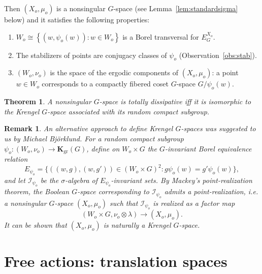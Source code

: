 \documentclass{amsart}
\numberwithin{equation}{subsection}
\newtheorem{rem}[thm]{Remark}
\newtheorem{mainthm}{Theorem}
\renewcommand{\themainthm}{\Alph{mainthm}}
\begin{document}
Then \(\left(X_{o},\mu_{o}\right)\) is a nonsingular \(G\)-space (see Lemma~\ref{lem:standardsigma} below) and it satisfies the following properties:
\begin{enumerate}
    \item \(W_{o}\cong\left\{\left(w,\psi_{o}\left(w\right)\right):w\in W_{o}\right\}\) is a Borel transversal for \(E_{G}^{X_{o}}\).
    \item The stabilizers of points are conjugacy classes of \(\psi_{o}\) (Observation~\ref{obs:stab}).
    \item \(\left(W_{o},\nu_{o}\right)\) is the space of the ergodic components of \(\left(X_{o},\mu_{o}\right)\): a point \(w\in W_{o}\) corresponds to a compactly fibered coset \(G\)-space \(G/\psi_{o}\left(w\right)\).
\end{enumerate}

\renewcommand{\themainthm}{G}
\begin{mainthm}
\label{mthm:generaldiss}
A nonsingular \(G\)-space is totally dissipative iff it is isomorphic to the Krengel \(G\)-space associated with its random compact subgroup.
\end{mainthm}
\renewcommand{\themainthm}{\Alph{mainthm}}

\begin{rem}
\label{rmk:michael}
An alternative approach to define Krengel \(G\)-spaces was suggested to us by Michael Bj\"{o}rklund. For a random compact subgroup \(\psi_{o}:\left(W_{o},\nu_{o}\right)\to\mathbf{K}_{\mathrm{gr}}\left(G\right)\), define on \(W_{o}\times G\) the \(G\)-invariant Borel equivalence relation
\[E_{\psi_{o}}=\big\{ \left(\left(w,g\right),\left(w,g'\right)\right)\in\left(W_{o}\times G\right)^{2}:g\psi_{o}\left(w\right)=g'\psi_{o}\left(w\right)\big\},\]
and let \(\mathcal{I}_{\psi_{o}}\) be the \(\sigma\)-algebra of \(E_{\psi_{o}}\)-invariant sets. By Mackey's point-realization theorem, the Boolean \(G\)-space corresponding to \(\mathcal{I}_{\psi_{o}}\) admits a point-realization, i.e. a nonsingular \(G\)-space \(\left(X_{o},\mu_{o}\right)\) such that \(\mathcal{I}_{\psi_{o}}\) is realized as a factor map 
\[\left(W_{o}\times G,\nu_{o}\otimes\lambda\right)\to\left(X_{o},\mu_{o}\right).\]
It can be shown that \(\left(X_{o},\mu_{o}\right)\) is naturally a Krengel \(G\)-space.
\end{rem}

\section{Free actions: translation spaces}
\end{document}
